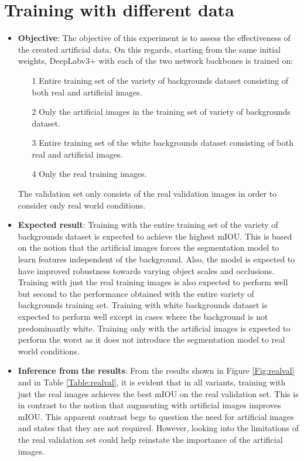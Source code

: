 \section{Training with different data}

	\begin{itemize}
		\item \textbf{Objective}: The objective of this experiment is to assess the effectiveness of the created artificial data. On this regards, starting from the same initial weights, DeepLabv3+ with each of the two network backbones is trained on:
		\begin{itemize}
			\item[1] Entire training set of the variety of backgrounds dataset consisting of both real and artificial images.
			\item[2] Only the artificial images in the training set of variety of backgrounds dataset.
			\item[3] Entire training set of the white backgrounds dataset consisting of both real and artificial images.
			\item[4] Only the real training images.
		\end{itemize}
	The validation set only consists of the real validation images in order to consider only real world conditions.
		\item \textbf{Expected result}: Training with the entire training set of the variety of backgrounds dataset is expected to achieve the highest mIOU. This is based on the notion that the artificial images forces the segmentation model to learn features independent of the background. Also, the model is expected to have improved robustness towards varying object scales and occlusions. Training with just the real training images is also expected to perform well but second to the performance obtained with the entire variety of backgrounds training set. Training with white backgrounds dataset is expected to perform well except in cases where the background is not predominantly white. Training only with the artificial images is expected to perform the worst as it does not introduce the segmentation model to real world conditions.
		\item \textbf{Inference from the results}: From the results shown in Figure \ref{Fig:realval} and in Table \ref{Table:realval}, it is evident that in all variants, training with just the real images achieves the best mIOU on the real validation set. This is in contrast to the notion that augmenting with artificial images improves mIOU. This apparent contrast begs to question the need for artificial images and states that they are not required. However, looking into the limitations of the real validation set could help reinstate the importance of the artificial images.

\end{itemize}
